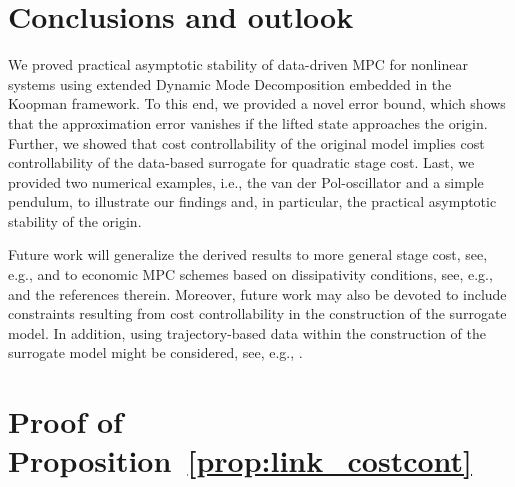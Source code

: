 \documentclass{article}
\numberwithin{equation}{section}
\begin{document}
	\FloatBarrier
	\section{Conclusions and outlook}
	\label{sec:conclusions}
	
	We proved practical asymptotic stability of data-driven MPC for nonlinear systems using extended Dynamic Mode Decomposition embedded in the Koopman framework. To this end, we provided a novel error bound, which shows that the approximation error vanishes if the lifted state approaches the origin. Further, we showed that cost controllability of the original model implies cost controllability of the data-based surrogate for quadratic stage cost. Last, we provided two numerical examples, i.e., the van der Pol-oscillator and a simple pendulum, to illustrate our findings and, in particular, the practical asymptotic stability of the origin.
	
	Future work will generalize the derived results to more general stage cost, see, e.g., \cite{CoroGrun20} and to economic MPC schemes based on dissipativity conditions, see, e.g., \cite{Grun22} and the references therein. 
	Moreover, future work may also be devoted to include constraints resulting from cost controllability in the construction of the surrogate model. In addition, using trajectory-based data within the construction of the surrogate model might be considered, see, e.g., \cite{SaltJaya22}.
	
	
	
	
	
	
	\appendix
	
	
	
	\section{Proof of Proposition~\ref{prop:link_costcont}}
	
\end{document}
